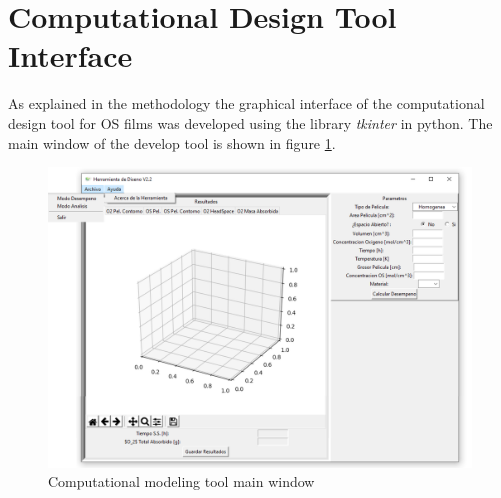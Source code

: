 \section{Computational Design Tool Interface}
As explained in the methodology the graphical interface of the computational design tool for OS films was developed  using the library \textit{tkinter} in python. The main window of the develop tool is shown in figure \ref{fig:intefaz_principal}.  

\begin{figure}[ht]
    \centering
    \includegraphics[width=\linewidth]{Documento_Latex/Imagenes/Interfaz.png}
    \caption{Computational modeling tool main window}
    \label{fig:intefaz_principal}
\end{figure}

